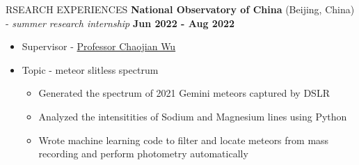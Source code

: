 \documentclass[11pt]{article}
\begin{document}
\begin{section}{RSEARCH EXPERIENCES}
\textbf{National Observatory of China} (Beijing, China) - \textit{summer research internship} \hfill \textbf{Jun 2022 - Aug 2022}
\begin{itemize}[leftmargin=1.5em]
    \item Supervisor - \href{mailto:chjwu@bao.ac.cn}{Professor Chaojian Wu}
    \item Topic - meteor slitless spectrum
    \begin{itemize}[leftmargin=1.5em]
        \item Generated the spectrum of 2021 Gemini meteors captured by DSLR
        \item Analyzed the intensitities of Sodium and Magnesium lines using Python
        \item Wrote machine learning code to filter and locate meteors from mass recording and perform photometry automatically
    \end{itemize}
\end{itemize}

\newpage


\end{section}
\end{document}
